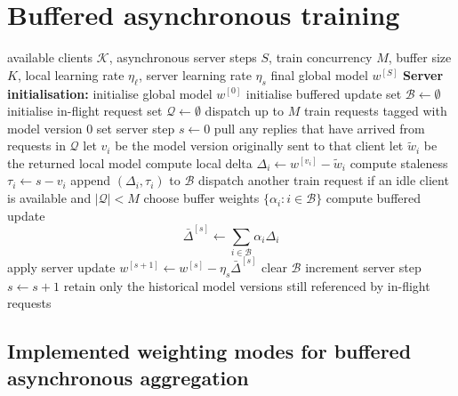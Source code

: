 \section{Buffered asynchronous training}

\begin{algorithm}[H]
\caption{\textcolor{fedbuffteal}{\texttt{FedBuff}} and \textcolor{fedstalebrown}{\texttt{FedStaleWeight}}}
\label{alg:fedbuff}
\begin{algorithmic}[1]
\Require available clients $\mathcal{K}$, asynchronous server steps $S$, train concurrency $M$, buffer size $K$, local learning rate $\eta_\ell$, server learning rate $\eta_s$
\Ensure final global model $w^{[S]}$
\Statex \textbf{Server initialisation:}
\State initialise global model $w^{[0]}$
\State initialise buffered update set $\mathcal{B} \gets \emptyset$
\State initialise in-flight request set $\mathcal{Q} \gets \emptyset$
\State dispatch up to $M$ train requests tagged with model version $0$
\State set server step $s \gets 0$
    \State pull any replies that have arrived from requests in $\mathcal{Q}$
        \State let $v_i$ be the model version originally sent to that client
        \State let $\tilde{w}_i$ be the returned local model
        \State compute local delta $\Delta_i \gets w^{[v_i]} - \tilde{w}_i$
        \State compute staleness $\tau_i \gets s - v_i$
        \State append $(\Delta_i,\tau_i)$ to $\mathcal{B}$
        \State dispatch another train request if an idle client is available and $|\mathcal{Q}| < M$
    \EndFor
        \State choose buffer weights $\{\alpha_i : i \in \mathcal{B}\}$ 
        \State compute buffered update
        \[
            \bar{\Delta}^{[s]} \gets \sum_{i \in \mathcal{B}} \alpha_i \Delta_i
        \]
        \State apply server update $w^{[s+1]} \gets w^{[s]} - \eta_s \bar{\Delta}^{[s]}$
        \State clear $\mathcal{B}$
        \State increment server step $s \gets s + 1$
        \State retain only the historical model versions still referenced by in-flight requests
    \EndIf
\EndWhile
\end{algorithmic}
\end{algorithm}

\subsection{Implemented weighting modes for buffered asynchronous aggregation}

